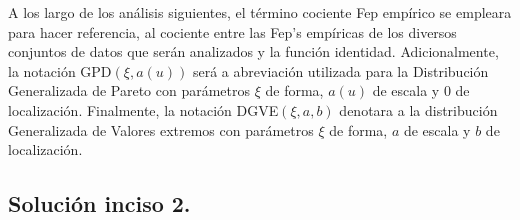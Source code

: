 \documentclass[10.5pt,notitlepage]{article}
\renewcommand{\qedsymbol}{$\blacksquare$}
\theoremstyle{plain}
\newenvironment{rem}
  {\pushQED{\qed}\renewcommand{\qedsymbol}{$\triangle$}\remarkex}
  {\popQED\endremarkex}
\begin{document}
\begin{rem}

A los largo de los análisis siguientes, el término cociente Fep empírico se empleara para hacer referencia, al cociente entre las Fep's empíricas de los diversos conjuntos de datos que serán analizados y la función identidad. Adicionalmente, la notación GPD\((\xi,a(u))\) será a abreviación utilizada para la Distribución Generalizada de Pareto con parámetros \(\xi\) de forma, \(a(u)\) de escala y \(0\) de localización. Finalmente, la notación DGVE\((\xi, a,b)\) denotara a la distribución Generalizada de Valores extremos con parámetros \(\xi\) de forma, \(a\) de escala y \(b\) de localización. 
\end{rem}

\subsection{Solución inciso 2.}
\end{document}
